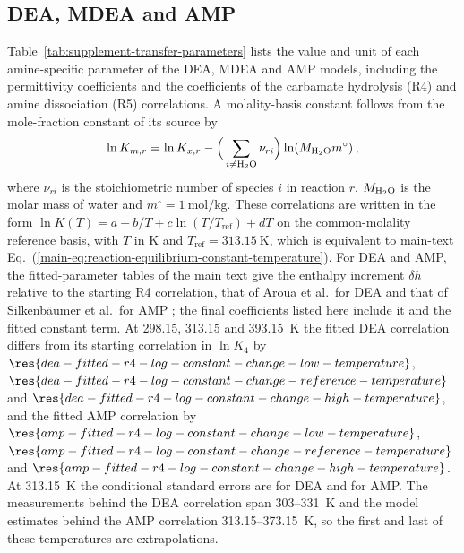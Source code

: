 \documentclass[a4paper,11pt]{article}
\begin{document}
\subsection{DEA, MDEA and AMP}
Table~\ref{tab:supplement-transfer-parameters} lists the value and unit of each amine-specific parameter of the DEA, MDEA and AMP models, including the permittivity coefficients and the coefficients of the carbamate hydrolysis (R4) and amine dissociation (R5) correlations.
A molality-basis constant follows from the mole-fraction constant of its source by
\begin{equation}
    \ln K_{m,r}=\ln K_{x,r}-\Big(\sum_{i\ne\HtwoO}\nu_{ri}\Big)\ln\!\left(M_{\HtwoO}m^{\circ}\right),
    \label{eq:molality-conversion}
\end{equation}
where $\nu_{ri}$ is the stoichiometric number of species $i$ in reaction $r$, $M_{\HtwoO}$ is the molar mass of water and $m^{\circ}=\SI{1}{\mole\per\kilogram}$.
These correlations are written in the form $\ln K(T)=a+b/T+c\ln(T/T_{\mathrm{ref}})+dT$ on the common-molality reference basis, with $T$ in K and $T_{\mathrm{ref}}=\SI{313.15}{\kelvin}$, which is equivalent to main-text Eq.~(\ref{main-eq:reaction-equilibrium-constant-temperature}).
For DEA and AMP, the fitted-parameter tables of the main text give the enthalpy increment $\delta h$ relative to the starting R4 correlation, that of Aroua et al.\ for DEA \cite{arouaTemperatureDependencyEquilibrium1997} and that of Silkenb\"aumer et al.\ for AMP \cite{silkenbaumerSolubilityCarbonDioxide1998}; the final coefficients listed here include it and the fitted constant term.
At 298.15, 313.15 and \SI{393.15}{\kelvin} the fitted DEA correlation differs from its starting correlation in $\ln K_4$ by $\res{dea-fitted-r4-log-constant-change-low-temperature}$, $\res{dea-fitted-r4-log-constant-change-reference-temperature}$ and $\res{dea-fitted-r4-log-constant-change-high-temperature}$, and the fitted AMP correlation by $\res{amp-fitted-r4-log-constant-change-low-temperature}$, $\res{amp-fitted-r4-log-constant-change-reference-temperature}$ and $\res{amp-fitted-r4-log-constant-change-high-temperature}$.
At \SI{313.15}{\kelvin} the conditional standard errors are  for DEA and  for AMP.
The measurements behind the DEA correlation span 303--\SI{331}{\kelvin} and the model estimates behind the AMP correlation 313.15--\SI{373.15}{\kelvin}, so the first and last of these temperatures are extrapolations.
\end{document}
